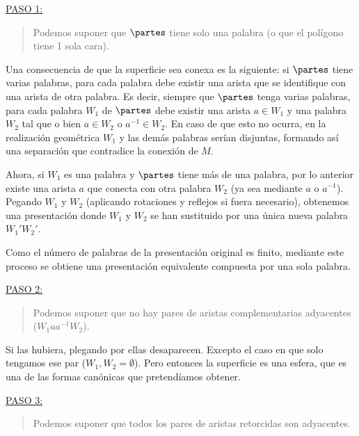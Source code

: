 {    \vspace{1.3em}
    \noindent
    \underline{PASO 1:}
    \begin{quote}
        Podemos suponer que $\partes$ tiene solo una palabra (o que el polígono tiene 1 sola cara).
    \end{quote}

    \noindent
    Una consecuencia de que la superficie sea conexa es la siguiente: si $\partes$ tiene varias palabras, para cada palabra debe existir una arista que se identifique con una arista de otra palabra. 
    Es decir, siempre que $\partes$ tenga varias palabras, para cada palabra $W_1$ de $\partes$ debe existir una arista $a \in W_1$ y una palabra $W_2$ tal que 
    o bien $a\in W_2$ o $a^{-1}\in W_2$. En caso de que esto no ocurra, en la realización geométrica $W_1$ y las demás palabras serían disjuntas, formando así una separación que
    contradice la conexión de $M$.

    \vspace{0.5em}
    \noindent
    Ahora, si $W_1$ es una palabra y $\partes$ tiene más de una palabra, por lo anterior existe una arista $a$ que conecta con otra palabra $W_2$ 
    (ya sea mediante $a$ o $a^{-1}$). Pegando $W_1$ y $W_2$ (aplicando rotaciones y reflejos si fuera necesario), 
    obtenemos una presentación donde $W_1$ y $W_2$ se han sustituido por una única nueva palabra $W_1'W_2'$. 

    \vspace{0.5em}
    \noindent
    Como el número de palabras de la presentación original es finito, mediante este proceso se obtiene una presentación equivalente compuesta por una sola palabra.

    \vspace{1.3em}
    \noindent
    \underline{PASO 2:}
    \begin{quote}
        Podemos suponer que no hay pares de aristas complementarias adyacentes ($W_1aa^{-1}W_2$).
    \end{quote}

    \noindent
    Si las hubiera, plegando por ellas desaparecen. Excepto el caso en que solo tengamos ese par ($W_1, W_2 = \emptyset$). 
    Pero entonces la superficie es una esfera, que es una de las formas canónicas que pretendíamos obtener.

    \vspace{1.3em}
    \noindent
    \underline{PASO 3:}
    \begin{quote}
        Podemos suponer que todos los pares de aristas retorcidas son adyacentes.
    \end{quote}

}
